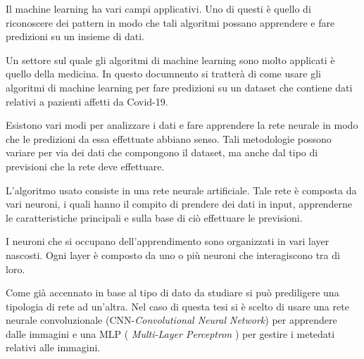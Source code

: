 Il machine learning ha vari campi applicativi.
Uno di questi è quello di riconoscere dei pattern in modo che tali algoritmi possano apprendere e fare predizioni su un insieme di dati.

Un settore sul quale gli algoritmi di machine learning sono molto applicati è quello della medicina.
In questo documnento si tratterà di come usare gli algoritmi di machine learning per fare predizioni su un dataset che contiene dati relativi a pazienti affetti da Covid-19.

Esistono vari modi per analizzare i dati e fare apprendere la rete neurale in modo che le predizioni da essa effettuate abbiano senso.
Tali metodologie possono variare per via dei dati che compongono il dataset, ma anche dal tipo di previsioni che la rete deve effettuare.

L'algoritmo usato consiste in una rete neurale artificiale.
Tale rete è composta da vari neuroni, i quali hanno il compito di prendere dei dati in input, apprenderne le caratteristiche principali e sulla base di ciò effettuare le previsioni.

I neuroni che si occupano dell'apprendimento sono organizzati in vari layer nascosti. Ogni layer è composto da uno o più neuroni che interagiscono tra di loro. 

Come già accennato in base al tipo di dato da studiare si può prediligere una tipologia di rete ad un'altra.
Nel caso di questa tesi si è scelto di usare una rete neurale convoluzionale (CNN-\emph{Convolutional Neural Network}) per apprendere dalle immagini e una MLP ( \emph{Multi-Layer Perceptron} ) per gestire i metedati relativi alle immagini.


